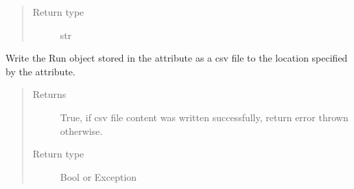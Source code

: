 \documentclass[letterpaper,10pt,english]{sphinxmanual}
\begin{document}
\begin{fulllineitems}
\begin{fulllineitems}
\begin{quote}
\begin{description}
\item[{Return type}] \leavevmode
str

\end{description}\end{quote}

\end{fulllineitems}


\begin{fulllineitems}
\label{\detokenize{polo.utils:polo.utils.io_utils.RunCsvWriter.write_csv}}
Write the Run object stored in the  attribute as a csv file
to the location specified by the  attribute.
\begin{quote}\begin{description}
\item[{Returns}] \leavevmode
True, if csv file content was written successfully,
return error thrown otherwise.

\item[{Return type}] \leavevmode
Bool or Exception

\end{description}\end{quote}

\end{fulllineitems}


\end{fulllineitems}

\end{document}
